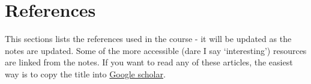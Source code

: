 \documentclass[
  openany]{book}
\theoremstyle{definition}
\theoremstyle{definition}
\theoremstyle{definition}
\theoremstyle{definition}
\theoremstyle{remark}
\begin{document}
\chapter*{References}\label{references}

This sections lists the references used in the course - it will be updated as the notes are updated. Some of the more accessible (dare I say `interesting') resources are linked from the notes. If you want to read any of these articles, the easiest way is to copy the title into \href{https://scholar.google.co.uk/}{Google scholar}.

  
\end{document}
